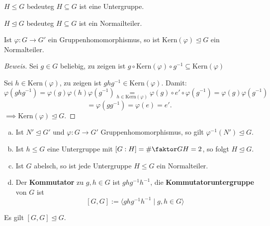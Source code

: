 \documentclass[a4paper]{report}
\begin{document}
\begin{nota*}
  \item $H \le G$ bedeuteg $H \subseteq G$ ist eine Untergruppe.
  \item $H \trianglelefteq G$ bedeuteg $H \subseteq G$ ist ein Normailteiler.
\end{nota*}

\begin{satz}
  Ist $\varphi : G \to G'$ ein Gruppenhomomorphismus, so ist $\mathrm{Kern}(\varphi) \trianglelefteq G$ ein Normalteiler.
  \begin{proof}[Beweis]
    Sei $g \in G$ beliebig, zu zeigen ist $g \circ \mathrm{Kern}(\varphi) \circ g^{-1} \subseteq \mathrm{Kern}(\varphi)$
    \item Sei $h \in \mathrm{Kern}(\varphi)$, zu zeigen ist $ghg^{-1} \in \mathrm{Kern}(\varphi)$.
    Damit:
    $$\varphi(ghg^{-1}) = \varphi(g)\varphi(h)\varphi(g^{-1}) \underset{h \in \mathrm{Kern}(\varphi)} = \varphi(g) \circ e' \circ \varphi(g^{-1}) = \varphi(g)\varphi(g^{-1})$$
    $$= \varphi(gg^{-1}) = \varphi(e) = e'.$$
    $\implies \mathrm{Kern}(\varphi) \trianglelefteq G.$
  \end{proof}
\end{satz}

\begin{ubng} \item
  \begin{enumerate}[(a)]
          \item Ist $N' \trianglelefteq G'$ und $\varphi : G \to G'$ Gruppenhomomorphismus, so gilt $\varphi^{-1}(N') \trianglelefteq G$.
    \item Ist $h \le G$ eine Untergruppe mit $[G:H] = \# \faktor GH= 2$, so folgt $H \trianglelefteq G$.
    \item Ist $G$ abelsch, so ist jede Untergruppe $H \le G$ ein Normalteiler.
    \item Der \textbf{Kommutator} zu $g, h \in G$ ist $ghg^{-1}h^{-1}$, die \textbf{Kommutatoruntergruppe} von $G$ ist $$[G, G]:= \langle ghg^{-1}h^{-1} \mid g, h \in G \rangle$$
\end{enumerate}
Es gilt $[G, G] \trianglelefteq G.$
\end{ubng}
\end{document}
